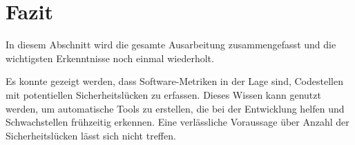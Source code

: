 \section{Fazit}
\label{sec:fazit}
In diesem Abschnitt wird die gesamte Ausarbeitung zusammengefasst und die wichtigsten Erkenntnisse noch einmal wiederholt.

Es konnte gezeigt werden, dass Software-Metriken in der Lage sind, Codestellen mit potentiellen Sicherheitslücken zu erfassen.
Dieses Wissen kann genutzt werden, um automatische Tools zu erstellen, die bei der Entwicklung helfen und Schwachstellen frühzeitig erkennen.
Eine verlässliche Voraussage über Anzahl der Sicherheitslücken lässt sich nicht treffen.
